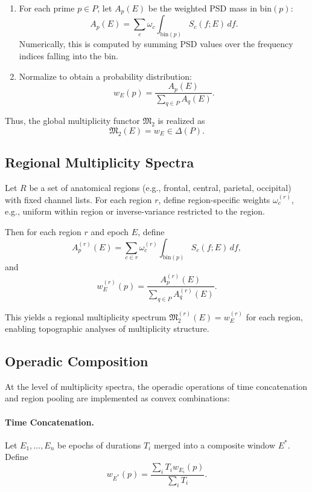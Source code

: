 \documentclass[11pt]{article}
\begin{document}
\begin{enumerate}[leftmargin=*]
  \item For each prime \(p \in P\), let \(A_p(E)\) be the weighted PSD mass in \(\mathrm{bin}(p)\):
  \[
    A_p(E) = \sum_{c} \omega_c \int_{\mathrm{bin}(p)} S_c(f;E) \, df.
  \]
  Numerically, this is computed by summing PSD values over the frequency indices falling into the bin.
  \item Normalize to obtain a probability distribution:
  \[
    w_E(p) = \frac{A_p(E)}{\sum_{q \in P} A_q(E)}.
  \]
\end{enumerate}

Thus, the global multiplicity functor \(\mathfrak{M}_2\) is realized as
\[
  \mathfrak{M}_2(E) = w_E \in \Delta(P).
\]

\subsection{Regional Multiplicity Spectra}

Let \(R\) be a set of anatomical regions (e.g., frontal, central, parietal, occipital) with fixed channel lists. For each region \(r\), define region-specific weights \(\omega_c^{(r)}\), e.g., uniform within region or inverse-variance restricted to the region.

Then for each region \(r\) and epoch \(E\), define
\[
  A_p^{(r)}(E) = \sum_{c \in r} \omega_c^{(r)} \int_{\mathrm{bin}(p)} S_c(f;E)\,df,
\]
and
\[
  w_E^{(r)}(p) = \frac{A_p^{(r)}(E)}{\sum_{q\in P} A_q^{(r)}(E)}.
\]

This yields a regional multiplicity spectrum \(\mathfrak{M}_2^{(r)}(E) = w_E^{(r)}\) for each region, enabling topographic analyses of multiplicity structure.

\subsection{Operadic Composition}

At the level of multiplicity spectra, the operadic operations of time concatenation and region pooling are implemented as convex combinations:

\paragraph{Time Concatenation.}
Let \(E_1, \dots, E_n\) be epochs of durations \(T_i\) merged into a composite window \(E^\ast\). Define
\[
  w_{E^\ast}(p) = \frac{\sum_{i} T_i w_{E_i}(p)}{\sum_i T_i}.
\]
\end{document}
